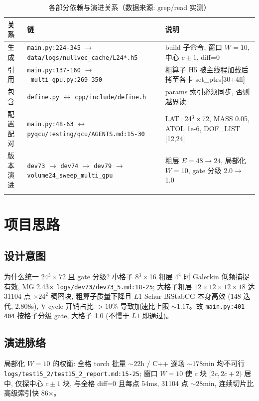 \documentclass[UTF8]{ctexart}
\begin{document}
\begin{xltabular}{\textwidth}{llX}
\toprule
关系 & 链 & 说明 \\
\midrule
\endhead
生成 & \texttt{\nolinkurl{main.py:224-345}} $\to$ \texttt{\nolinkurl{data/logs/nullvec_cache/L24*.h5}} & build 子命令, 窗口 $W=10$, 中心 $c\pm1$, diff=0 \\
引用 & \texttt{\nolinkurl{main.py:137-160}} $\to$ \texttt{\nolinkurl{_multi_gpu.py:269-350}} & 粗算子 H5 被主线程加载后拷至各卡 set\_ptrs[30+4fl] \\
包含 & \texttt{\nolinkurl{define.py}} $\leftrightarrow$ \texttt{\nolinkurl{cpp/include/define.h}} & params 索引必须同步, 否则越界读 \\
配置配对 & \texttt{\nolinkurl{main.py:48-63}} $\leftrightarrow$ \texttt{\nolinkurl{pyqcu/testing/qcu/AGENTS.md:15-30}} & LAT=24$^3\times$72, MASS 0.05, ATOL 1e-6, DOF\_LIST [12,24] \\
版本演进 & \texttt{\nolinkurl{dev73}} $\to$ \texttt{\nolinkurl{dev74}} $\to$ \texttt{\nolinkurl{dev79}} $\to$ \texttt{\nolinkurl{volume24_sweep_multi_gpu}} & 粗层 $E=48\to24$, 局部化 $W=10$, gate 分级 2.0$\to$1.0 \\
\bottomrule
\caption{各部分依赖与演进关系（数据来源: grep/read 实测）}
\end{xltabular}

\section{项目思路}
\subsection{设计意图}
\textcolor{idea}{为什么统一 24$^3\times$72 且 gate 分级?} 小格子 8$^3\times$16 粗层 $4^4$ 时 Galerkin 低频捕捉有效, MG 2.43$\times$ \textcolor{evidence}{\texttt{\nolinkurl{logs/dev73/dev73_5.md:18-25}}}; 大格子粗层 $12\times12\times12\times18$ 达 31104 点 $\times 24^2$ 稠密块, 粗算子质量下降且 $L1$ Schur BiStabCG 本身高效 (148 迭代, 2.808s), V-cycle 开销占比 $>10\%$ 导致加速比上限 $\sim1.17$。故 \texttt{\nolinkurl{main.py:401-404}} 按格子分级 gate, 大格子 1.0 (不慢于 $L1$ 即通过)。

\subsection{演进脉络}
\textcolor{idea}{局部化 $W=10$ 的权衡:} 全格 torch 批量 $\sim22$h / C++ 逐场 $\sim178$min 均不可行 \textcolor{evidence}{\texttt{\nolinkurl{logs/test15_2/test15_2_report.md:15-25}}}; 窗口 $W=10$ 使 $c$ 块 $[2c,2c+2)$ 居中, 仅探中心 $c\pm1$ 块, 与全格 diff=0 且每点 54ms, 31104 点 $\sim28$min, 连续切片比高级索引快 86$\times$。
\end{document}
